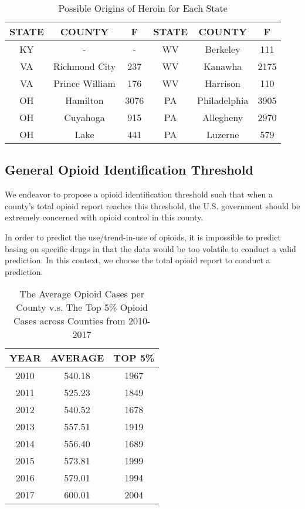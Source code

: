 \begin{table}[H]
	\centering
	\begin{tabular}{|c|c|c||c|c|c|}
		\hline
		\rowcolor[HTML]{656565} 
		{\color[HTML]{FFFFFF} \textbf{STATE}} & {\color[HTML]{FFFFFF} \textbf{COUNTY}} & {\color[HTML]{FFFFFF} \textbf{F}} &{\color[HTML]{FFFFFF} \textbf{STATE}} & {\color[HTML]{FFFFFF} \textbf{COUNTY}} & {\color[HTML]{FFFFFF} \textbf{F}}\\ \hline
		KY & - & - &WV & Berkeley & 111 \\ \hline
		VA & Richmond City & 237 &WV & Kanawha & 2175\\ \hline
		VA & Prince William & 176 & WV& Harrison&110 \\ \hline
		OH & Hamilton & 3076 &PA & Philadelphia & 3905 \\ \hline
		OH & Cuyahoga & 915 & PA & Allegheny & 2970 \\ \hline
		OH & Lake & 441 & PA & Luzerne & 579\\ \hline
	\end{tabular}
	\centering
	\caption{Possible Origins of Heroin for Each State}
\end{table}

\subsection{General Opioid Identification Threshold}
We endeavor to propose a opioid identification threshold such that when a county's total opioid report reaches this threshold, the U.S. government should be extremely concerned with opioid control in this county.

In order to predict the use/trend-in-use of opioids, it is impossible to predict basing on specific drugs in that the data would be too volatile to conduct a valid prediction. In this context, we choose the total opioid report to conduct a prediction.

\begin{table}[H]
\centering
\begin{tabular}{|c|c|c|}
\hline
\rowcolor[HTML]{656565} 
{\color[HTML]{FFFFFF} \textbf{YEAR}} & {\color[HTML]{FFFFFF} \textbf{AVERAGE}} & {\color[HTML]{FFFFFF} \textbf{TOP 5\%}} \\ \hline
2010 & 540.18 & 1967 \\ \hline
2011 & 525.23 & 1849 \\ \hline
2012 & 540.52 & 1678 \\ \hline
2013 & 557.51 & 1919 \\ \hline
2014 & 556.40 & 1689 \\ \hline
2015 & 573.81 & 1999 \\ \hline
2016 & 579.01 & 1994 \\ \hline
2017 & 600.01 & 2004 \\ \hline
\end{tabular}
\centering
\caption{The Average Opioid Cases per County v.s. The Top 5\% Opioid Cases across Counties from 2010-2017}
\end{table}

